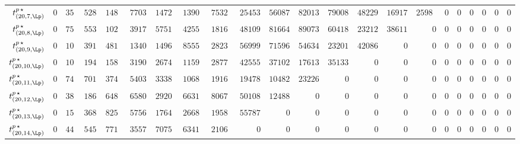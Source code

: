 \begin{tabular}{r|rrrrrrrrrrrrrrrrrrrrr}
  $t^{p \, \star}_{(20,7,\Lp)}$ & $0$ & $358822$ & $5284203972$ & $1482928426491$ & $77030667542372$ & $1472476688174400$ & $13900750752466248$ & $75323122758515415$ & $254538546448200840$ & $560872131447043080$ & $820133695715886720$ & $790086766428701280$ & $482291092600067520$ & $169173209222297280$ & $25988068005419520$ & $0$ & $0$ & $0$ & $0$ & $0$ & $0$ \\
  $t^{p \, \star}_{(20,8,\Lp)}$ & $0$ & $752182$ & $5531805988$ & $1027660940922$ & $39178039450472$ & $575174264602005$ & $4255054474160706$ & $18168609579889671$ & $48109768612113720$ & $81664211739293280$ & $89073033242184720$ & $60418982357799120$ & $23212157319806400$ & $3861191616796800$ & $0$ & $0$ & $0$ & $0$ & $0$ & $0$ & $0$ \\
  $t^{p \, \star}_{(20,9,\Lp)}$ & $0$ & $1059945$ & $3917005798$ & $481601130486$ & $13401951120320$ & $149656890090335$ & $855543910290366$ & $2823225628719013$ & $5699946050652808$ & $7159625338602330$ & $5463400239838620$ & $2320169457307680$ & $420862848777360$ & $0$ & $0$ & $0$ & $0$ & $0$ & $0$ & $0$ & $0$ \\
  $t^{p \, \star}_{(20,10,\Lp)}$ & $0$ & $1044990$ & $1949636396$ & $158328764751$ & $3190486415492$ & $26745173420870$ & $115927563465156$ & $287750070027007$ & $425552390258984$ & $371020621249575$ & $176134939347970$ & $35133135394610$ & $0$ & $0$ & $0$ & $0$ & $0$ & $0$ & $0$ & $0$ & $0$ \\
  $t^{p \, \star}_{(20,11,\Lp)}$ & $0$ & $743088$ & $701576624$ & $37459664472$ & $540312151760$ & $3338664498425$ & $10683518952630$ & $19167082644451$ & $19478625862248$ & $10482628305429$ & $2322677883330$ & $0$ & $0$ & $0$ & $0$ & $0$ & $0$ & $0$ & $0$ & $0$ & $0$ \\
  $t^{p \, \star}_{(20,12,\Lp)}$ & $0$ & $389453$ & $186111150$ & $6480923799$ & $65801127644$ & $292014845275$ & $663104264526$ & $806795665452$ & $501082136976$ & $124882127568$ & $0$ & $0$ & $0$ & $0$ & $0$ & $0$ & $0$ & $0$ & $0$ & $0$ & $0$ \\
  $t^{p \, \star}_{(20,13,\Lp)}$ & $0$ & $152596$ & $36823576$ & $825435435$ & $5756190260$ & $17646909610$ & $26689673340$ & $19588844940$ & $5578782720$ & $0$ & $0$ & $0$ & $0$ & $0$ & $0$ & $0$ & $0$ & $0$ & $0$ & $0$ & $0$ \\
  $t^{p \, \star}_{(20,14,\Lp)}$ & $0$ & $44988$ & $5455136$ & $77100798$ & $355723928$ & $707525505$ & $634137522$ & $210684474$ & $0$ & $0$ & $0$ & $0$ & $0$ & $0$ & $0$ & $0$ & $0$ & $0$ & $0$ & $0$ & $0$ \\

\end{tabular}
